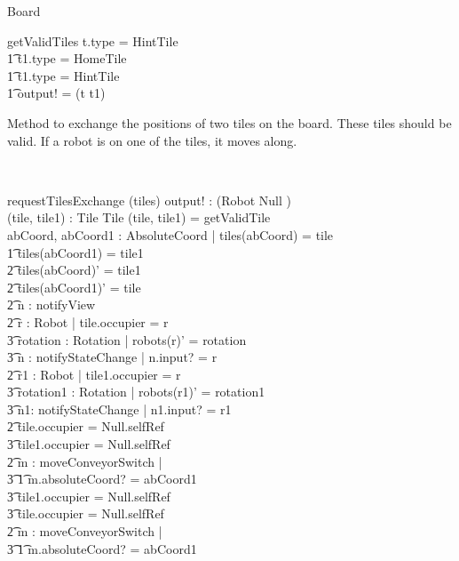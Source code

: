 \documentclass[12pt]{article}
\begin{document}
\begin{class}{Board}
\begin{schema}{getValidTiles}
t.type \not = HintTile \\ \t1
t1.type \not = HomeTile \\ \t1
t1.type \not = HintTile \implies \\ \t1
output! = (t \cross t1)
\end{schema}
\znewpage
\begin{classcom}
Method to exchange the positions of two tiles on the board. These tiles should be valid. If a robot is on one of the tiles, it moves along.
\end{classcom} \\
\begin{schema}{requestTilesExchange}
\Delta (tiles)
output! : ({Robot \union Null} ) \\
(tile, tile1) : Tile \cross Tile
\where
(tile, tile1)  = getValidTile \\
\exists abCoord, abCoord1 : AbsoluteCoord | tiles(abCoord) = tile \\ \t1
tiles(abCoord1) = tile1 \implies \\ \t2
tiles(abCoord)' = tile1 \\ \t2
tiles(abCoord1)' = tile \\ \t2
\exists n : notifyView \\ \t2
\exists r : Robot | tile.occupier = r \implies \\ \t3
\exists rotation : Rotation | robots(r)' = rotation \\ \t3
\exists n : notifyStateChange | n.input? = r \\ \t2
\exists r1 : Robot | tile1.occupier = r \implies \\ \t3
\exists rotation1 : Rotation | robots(r1)' = rotation1 \\ \t3
\exists n1: notifyStateChange | n1.input? = r1 \\ \t2
\IF tile.occupier = Null.selfRef \\ \t3
tile1.occupier \not = Null.selfRef\\ \t2
\THEN \exists m : moveConveyorSwitch | \\ \t3 \t1 m.absoluteCoord? = abCoord1 \\ \t3
\IF tile1.occupier = Null.selfRef \\ \t3
tile.occupier \not = Null.selfRef \\ \t2
\THEN \exists m : moveConveyorSwitch | \\ \t3 \t1 m.absoluteCoord? = abCoord1
\end{schema} \\
\begin{classcom}

\end{classcom}
\end{class}
\end{document}
